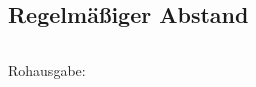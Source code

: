 \subsection{Regelmäßiger Abstand}
    \label{appdx:tv1-1}
    {  
        \renewcommand{\fcolorbox}[4][]{#4}
        \inputminted[linenos,breaklines,autogobble,frame=leftline,framesep=10pt]{gnuplot}{plots/tv1-1.gp}
    }
    Rohausgabe:
    \inputminted[linenos,breaklines,autogobble,frame=leftline,framesep=10pt]{text}{plots/tv1-1.gp.out}